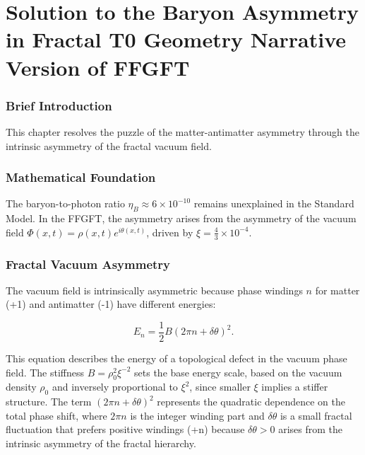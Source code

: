 \chapter{Solution to the Baryon Asymmetry in Fractal T0 Geometry  Narrative Version of FFGFT}


	
	\subsection*{Brief Introduction}
	
	This chapter resolves the puzzle of the matter-antimatter asymmetry through the intrinsic asymmetry of the fractal vacuum field.
	
	\subsection*{Mathematical Foundation}
	
	The baryon-to-photon ratio \(\eta_B \approx 6 \times 10^{-10}\) remains unexplained in the Standard Model. In the FFGFT, the asymmetry arises from the asymmetry of the vacuum field \(\Phi(x,t) = \rho(x,t) e^{i\theta(x,t)}\), driven by \(\xi = \frac{4}{3} \times 10^{-4}\).
	

	
	\subsection*{Fractal Vacuum Asymmetry}
	
	The vacuum field is intrinsically asymmetric because phase windings \(n\) for matter (+1) and antimatter (-1) have different energies:
	
	\begin{equation}
		E_n = \frac{1}{2} B (2\pi n + \delta \theta)^2.
	\end{equation}
	
	This equation describes the energy of a topological defect in the vacuum phase field. The stiffness \(B = \rho_0^2 \xi^{-2}\) sets the base energy scale, based on the vacuum density \(\rho_0\) and inversely proportional to \(\xi^2\), since smaller \(\xi\) implies a stiffer structure. The term \((2\pi n + \delta \theta)^2\) represents the quadratic dependence on the total phase shift, where \(2\pi n\) is the integer winding part and \(\delta \theta\) is a small fractal fluctuation that prefers positive windings (+n) because \(\delta \theta > 0\) arises from the intrinsic asymmetry of the fractal hierarchy.
	

